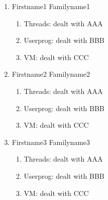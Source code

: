 \documentclass[a4paper,12pt]{report}
\begin{document}
\begin{enumerate}
	\item Firstname1 Familyname1 
	    \begin{enumerate}
	     \item Threads: dealt with AAA
	     \item Userprog: dealt with BBB
	     \item VM: dealt with CCC
	    \end{enumerate}

	\item Firstname2 Familyname2
	    \begin{enumerate}
	     \item Threads: dealt with AAA
	     \item Userprog: dealt with BBB
	     \item VM: dealt with CCC
	    \end{enumerate}
	    
	\item Firstname3 Familyname3
	    \begin{enumerate}
	     \item Threads: dealt with AAA
	     \item Userprog: dealt with BBB
	     \item VM: dealt with CCC
	    \end{enumerate}

	   
\end{enumerate}













\end{document}
